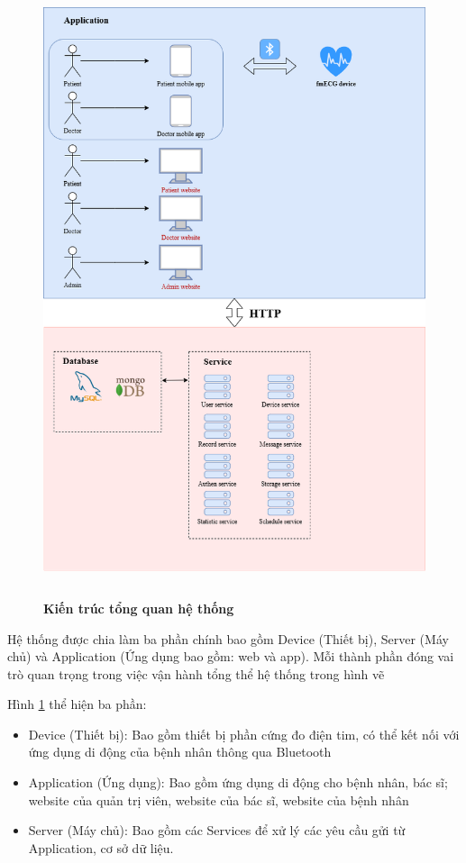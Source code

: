 \begin{figure}[H]
  \centering
  \includegraphics[width=12cm,height=18cm]{Images/System/fmECG_architecture-System_Architecture.drawio.png}
  \caption[Kiến trúc tổng quan hệ thống]{\bfseries \fontsize{12pt}{0pt}\selectfont Kiến trúc tổng quan hệ thống}
  \label{fmECG_architecture-System} %
\end{figure}
Hệ thống được chia làm ba phần chính bao gồm Device (Thiết bị), Server (Máy chủ) và Application (Ứng dụng bao gồm: web và app).
Mỗi thành phần đóng vai trò quan trọng trong việc vận hành tổng thể hệ thống trong hình vẽ

Hình \ref{fmECG_architecture-System} thể hiện ba phần: 

\begin{adjustwidth}{1.5em}{}
\begin{itemize}
  \item Device (Thiết bị): Bao gồm thiết bị phần cứng đo điện tim, có thể kết nối với ứng dụng di động của bệnh nhân thông qua Bluetooth 
  \item Application (Ứng dụng): Bao gồm ứng dụng di động cho bệnh nhân, bác sĩ; website của quản trị viên, website của bác sĩ, website của bệnh nhân
  \item Server (Máy chủ): Bao gồm các Services để xử lý các yêu cầu gửi từ Application, cơ sở dữ liệu.
\end{itemize}
\end{adjustwidth}


